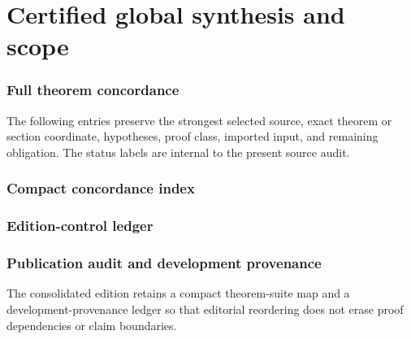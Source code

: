 \documentclass[11pt]{article}
\theoremstyle{definition}
\theoremstyle{remark}
\begin{document}








\part{Certified global synthesis and scope}








\appendix

\section{Full theorem concordance}
\label{app:full-concordance}

The following entries preserve the strongest selected source, exact theorem or section coordinate, hypotheses, proof class, imported input, and remaining obligation. The status labels are internal to the present source audit.



\clearpage
\section{Compact concordance index}


\clearpage
\section{Edition-control ledger}


\clearpage
\section{Publication audit and development provenance}
\label{app:block15-publication-audit}

The consolidated edition retains a compact theorem-suite map and a development-provenance ledger so that editorial reordering does not erase proof dependencies or claim boundaries.


\end{document}
